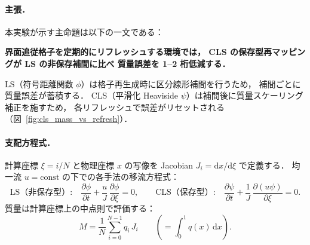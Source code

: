%

\paragraph{主張．}

本実験が示す主命題は以下の一文である：

\begin{center}
\textbf{%
  界面追従格子を定期的にリフレッシュする環境では，%
  CLS の保存型再マッピングが LS の非保存補間に比べ%
  質量誤差を 1--2 桁低減する．}
\end{center}

LS（符号距離関数 $\phi$）は格子再生成時に区分線形補間を行うため，
補間ごとに質量誤差が蓄積する．
CLS（平滑化 Heaviside $\psi$）は補間後に質量スケーリング補正を施すため，
各リフレッシュで誤差がリセットされる（図~\ref{fig:cls_mass_vs_refresh}）．

\paragraph{支配方程式．}

計算座標 $\xi = i/N$ と物理座標 $x$ の写像を Jacobian $J_i = \mathrm{d}x/\mathrm{d}\xi$ で定義する．
均一流 $u = \mathrm{const}$ の下での各手法の移流方程式：
\begin{equation}
  \text{LS（非保存型）:}\quad
  \frac{\partial \phi}{\partial t} + \frac{u}{J}\,\frac{\partial \phi}{\partial \xi} = 0,
  \qquad
  \text{CLS（保存型）:}\quad
  \frac{\partial \psi}{\partial t} + \frac{1}{J}\,\frac{\partial (u\psi)}{\partial \xi} = 0.
\end{equation}
質量は計算座標上の中点則で評価する：
\begin{equation}
  M = \frac{1}{N}\sum_{i=0}^{N-1} q_i\, J_i
  \qquad \left(= \int_0^1 q(x)\,\mathrm{d}x\right).
\end{equation}

